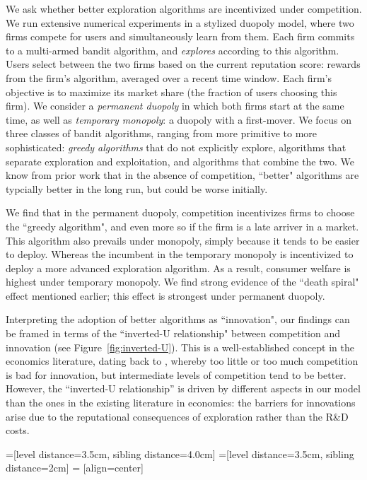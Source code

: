 \documentclass[format=acmsmall, review=false]{acmart}
\theoremstyle{definition}
\newcommand{\xhdr}[1]{\vspace{1mm} \noindent{\bf #1}}
\begin{document}
We ask whether better exploration algorithms are incentivized under competition.  We run extensive numerical experiments in a stylized duopoly model, where two firms compete for users and simultaneously learn from them. Each firm commits to a multi-armed bandit algorithm, and \emph{explores} according to this algorithm. Users select between the two firms based on the current reputation score: rewards from the firm's algorithm, averaged over a recent time window. Each firm's objective is to maximize its market share (the fraction of users choosing this firm). We consider a \emph{permanent duopoly} in which both firms start at the same time, as well as \emph{temporary monopoly}: a duopoly with a first-mover. We focus on three classes of bandit algorithms, ranging from more primitive to more sophisticated: \emph{greedy algorithms} that do not explicitly explore, algorithms that separate exploration and exploitation, and algorithms that combine the two. We know from prior work that in the absence of competition,  ``better" algorithms are typcially better in the long run, but could be worse initially.

\xhdr{Main findings.}
We find that in the permanent duopoly, competition incentivizes firms to choose the ``greedy algorithm", and even more so if the firm is a late arriver in a market. This algorithm also prevails under monopoly, simply because it tends to be easier to deploy. Whereas the incumbent in the temporary monopoly is incentivized to deploy a more advanced exploration algorithm. As a result, consumer welfare is highest under temporary monopoly. We find strong evidence of the ``death spiral" effect mentioned earlier; this effect is strongest under permanent duopoly.

Interpreting the adoption of better algorithms as ``innovation", our findings can be framed in terms of the ``inverted-U relationship" between competition and innovation (see Figure~\ref{fig:inverted-U}). This is a well-established concept in the economics literature, dating back to \cite{Schumpeter-42}, whereby too little or too much competition is bad for innovation, but intermediate levels of competition tend to be better. However, the ``inverted-U relationship'' is driven by different aspects in our model than the ones in the existing literature in economics:  the barriers for innovations arise due to the reputational consequences of exploration rather than the R\&D costs.


=[level distance=3.5cm, sibling distance=4.0cm]
=[level distance=3.5cm, sibling distance=2cm]
 = [align=center]
\end{document}
